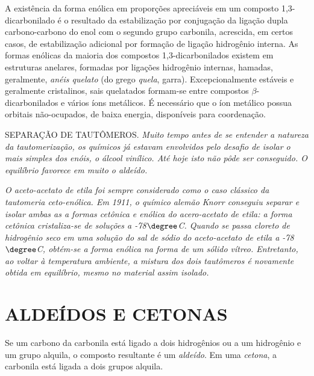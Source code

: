 \noindent A existência da forma enólica em proporções apreciáveis em um composto 1,3-dicarbonilado é o resultado da estabilização por conjugação da ligação dupla carbono-carbono do enol com o segundo grupo carbonila, acrescida, em certos casos, de estabilização adicional por formação de ligação hidrogênio interna. As formas enólicas da maioria dos compostos 1,3-dicarbonilados existem em estruturas anelares, formadas por ligações hidrogênio internas, hamadas, geralmente, \textit{anéis quelato} (do grego \textit{quela}, garra). Excepcionalmente estáveis e geralmente cristalinos, sais quelatados formam-se entre compostos $\beta$-dicarbonilados e vários íons metálicos. É necessário que o íon metálico possua orbitais não-ocupados, de baixa energia, disponíveis para coordenação.

\begin{tightcenter}
    \chemnameinit{}
    \qquad\qquad
\end{tightcenter}

\par\bigskip
\noindent SEPARAÇÃO DE TAUTÔMEROS. \textit{Muito tempo antes de se entender a natureza da tautomerização, os químicos já estavam envolvidos pelo desafio de isolar o mais simples dos enóis, o álcool vinílico. Até hoje isto não pôde ser conseguido. O equilíbrio favorece em muito o aldeído.}

\textit{O aceto-acetato de etila foi sempre considerado como o caso clássico da tautomeria ceto-enólica. Em 1911, o químico alemão Knorr conseguiu separar e isolar ambas as a formas cetônica e enólica do acero-acetato de etila: a forma cetônica cristaliza-se de soluções a -78$\degree$C. Quando se passa cloreto de hidrogênio seco em uma solução do sal de sódio do aceto-acetato de etila a -78$\degree$C, obtém-se a forma enólica na forma de um sólido vítreo. Entretanto, ao voltar à temperatura ambiente, a mistura dos dois tautômeros é novamente obtida em equilíbrio, mesmo no material assim isolado.}

\section{ALDEÍDOS E CETONAS}

Se um carbono da carbonila está ligado a dois hidrogênios ou a um hidrogênio e um grupo alquila, o composto resultante é um \textit{aldeído}. Em uma \textit{cetona}, a carbonila está ligada a dois grupos alquila.

